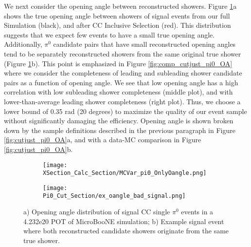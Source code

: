 \par We next consider the opening angle between reconstructed showers. Figure \ref{fig:mcvar_pi0_onlyoangle}a shows the true opening angle between showers of signal events from our full Simulation (black), and after CC Inclusive Selection (red). This distribution suggests that we expect few events to have a small true opening angle. Additionally, $\pi^0$ candidate pairs that have small reconstructed opening angles tend to be separately reconstructed showers from the same original true shower (Figure \ref{fig:mcvar_pi0_onlyoangle}b). This point is emphasized in Figure \ref{fig:comp_cutjust_pi0_OA} where we consider the completeness of leading and subleading shower candidate pairs as a function of opening angle. We see that low opening angle has a high correlation with low subleading shower completeness (middle plot), and with lower-than-average leading shower completeness (right plot). Thus, we choose a lower bound of 0.35 rad (20 degrees) to maximize the quality of our event sample without significantly damaging the efficiency. Opening angle is shown broken down by the sample definitions described in the previous paragraph in Figure \ref{fig:cutjust_pi0_OA}a, and with a data-MC comparison in Figure \ref{fig:cutjust_pi0_OA}b. %


\begin{figure}[H]
\centering
  \begin{subfigure}[t]{0.35\textwidth}
    \centering
     \texttt{[image: XSection\_Calc\_Section/MCVar\_pi0\_OnlyOangle.png]}
     \caption{ }
  \end{subfigure} 
  \begin{subfigure}[t]{0.6\textwidth}
    \centering
    \texttt{[image: Pi0\_Cut\_Section/ex\_oangle\_bad\_signal.png]}
    \caption{ }
  \end{subfigure} 
  \caption{ a) Opening angle distribution of signal CC single $\pi^0$ events in a 4.232e20 POT of MicroBooNE simulation; b) Example signal event where both reconstructed candidate showers originate from the same true shower. }
\label{fig:mcvar_pi0_onlyoangle}
\end{figure}

